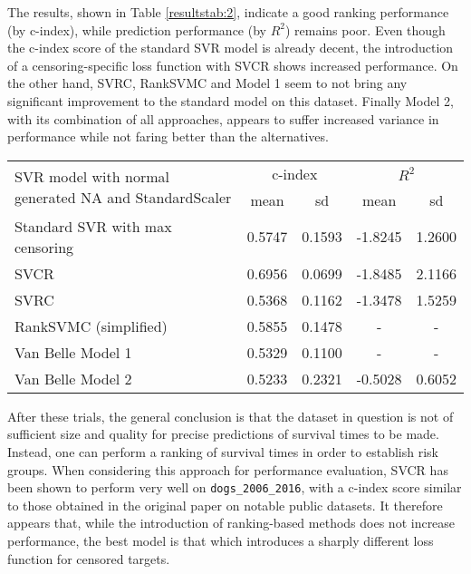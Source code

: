 \documentclass[12pt]{report}
\begin{document}
The results, shown in Table \ref{resultstab:2}, indicate a good ranking performance (by c-index), while prediction performance (by $R^2$) remains poor. Even though the c-index score of the standard SVR model is already decent, the introduction of a censoring-specific loss function with SVCR shows increased performance. On the other hand, SVRC, RankSVMC and Model 1 seem to not bring any significant improvement to the standard model on this dataset. Finally Model 2, with its combination of all approaches, appears to suffer increased variance in performance while not faring better than the alternatives.

\begin{center}
 \begin{tabular}{ |m{7cm}|c|c|c|c| }
\hline
\multirow{2}{=}{SVR model with normal generated NA and StandardScaler} & \multicolumn{2}{|c|}{c-index} & \multicolumn{2}{|c|}{$R^2$} \\ \cline{2-5}
& mean & sd & mean & sd \\ \hline
Standard SVR with max censoring & 0.5747 & 0.1593 & -1.8245 & 1.2600 \\ \hline
SVCR & 0.6956 & 0.0699 & -1.8485 & 2.1166 \\ \hline
SVRC & 0.5368 & 0.1162 & -1.3478 & 1.5259 \\ \hline
RankSVMC (simplified) & 0.5855 & 0.1478 & - & - \\ \hline
Van Belle Model 1 & 0.5329 & 0.1100 & - & - \\ \hline
Van Belle Model 2 & 0.5233 & 0.2321 & -0.5028 & 0.6052 \\ \hline
\end{tabular}
\label{resultstab:2}
\end{center} 

After these trials, the general conclusion is that the dataset in question is not of sufficient size and quality for precise predictions of survival times to be made. Instead, one can perform a ranking of survival times in order to establish risk groups. When considering this approach for performance evaluation, SVCR \cite{shivaswamy07} has been shown to perform very well on \texttt{dogs\_2006\_2016}, with a c-index score similar to those obtained in the original paper on notable public datasets. It therefore appears that, while the introduction of ranking-based methods does not increase performance, the best model is that which introduces a sharply different loss function for censored targets.
\end{document}
